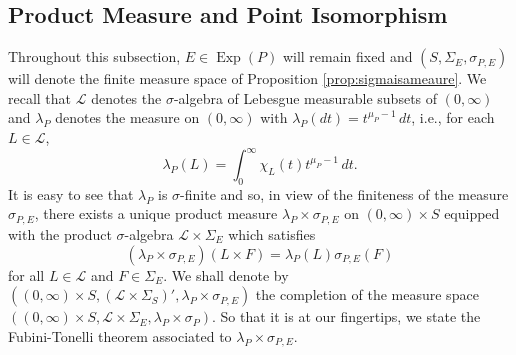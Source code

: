 \documentclass[11pt]{article}
\newcommand\Exp{\operatorname{Exp}}
\begin{document}
\subsection{Product Measure and Point Isomorphism}\label{subsec:ProductMeasure}

Throughout this subsection, $E\in\Exp(P)$ will remain fixed and $(S,\Sigma_{E},\sigma_{P,E})$ will denote the finite measure space of Proposition \ref{prop:sigmaisameaure}. We recall that $\mathcal{L}$ denotes the $\sigma$-algebra of Lebesgue measurable subsets of $(0,\infty)$ and  $\lambda_P$ denotes the measure on $(0,\infty)$ with $\lambda_P(dt)=t^{\mu_P-1}\,dt$, i.e., for each $L\in\mathcal{L}$,
\begin{equation*}
\lambda_P(L)=\int_0^\infty \chi_L(t)t^{\mu_P-1}\,dt.
\end{equation*}
It is easy to see that $\lambda_P$ is $\sigma$-finite and so, in view of the finiteness of the measure $\sigma_{P,E}$, there exists a unique product measure $\lambda_P\times\sigma_{P,E}$ on $(0,\infty)\times S$ equipped with the product $\sigma$-algebra $\mathcal{L}\times\Sigma_{E}$ which satisfies
\begin{equation*}
    (\lambda_P\times\sigma_{P,E})(L\times F)=\lambda_P(L)\sigma_{P,E}(F)
\end{equation*}
for all $L\in\mathcal{L}$ and $F\in\Sigma_{E}$. We shall denote by $((0,\infty)\times S,(\mathcal{L}\times\Sigma_S)',\lambda_P\times\sigma_{P,E})$ the completion of the measure space $((0,\infty)\times S,\mathcal{L}\times\Sigma_E,\lambda_P\times\sigma_P)$. So that it is at our fingertips, we state the Fubini-Tonelli theorem associated to $\lambda_P\times \sigma_{P,E}$.
\end{document}
